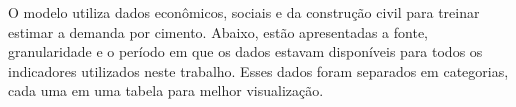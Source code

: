     
O modelo utiliza dados econômicos, sociais e da construção
civil para treinar estimar a demanda por cimento. Abaixo, estão
apresentadas a fonte, granularidade e o período em que os dados 
estavam disponíveis para todos os indicadores utilizados neste 
trabalho. Esses dados foram separados em categorias, cada uma
em uma tabela para melhor visualização.


